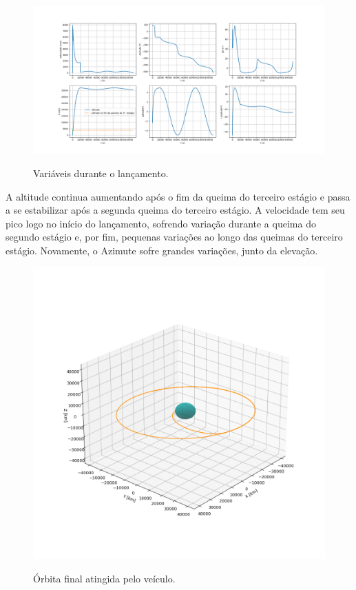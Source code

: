 \begin{figure}[H]
    \begin{center}
        \caption{Variáveis durante o lançamento.}
        \includegraphics[width=6in]{figuras/Figure_1.png}
        \label{fig:3}
     \end{center}
\end{figure}

A altitude continua aumentando após o fim da queima do terceiro estágio e passa a se estabilizar após a segunda queima do terceiro estágio. A velocidade tem seu pico logo no início do lançamento, sofrendo variação durante a queima do segundo estágio e, por fim, pequenas variações ao longo das queimas do terceiro estágio. Novamente, o Azimute sofre grandes variações, junto da elevação. 

\begin{figure}[H]
    \begin{center}
        \caption{Órbita final atingida pelo veículo.}
        \includegraphics[width=6in]{figuras/fig_6.png}
        \label{fig:3}
     \end{center}
\end{figure}

